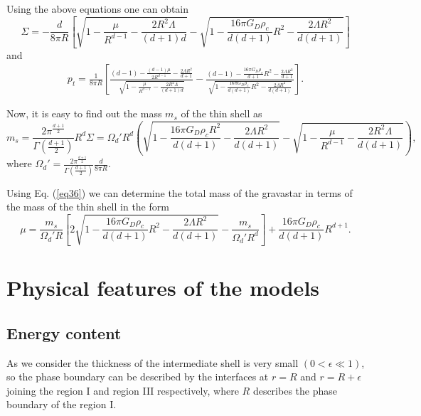 \documentclass[preprint,12pt]{elsarticle}
\begin{document}
Using the above equations one can obtain
\begin{equation}
\Sigma=-\frac{d}{8\pi R}\left[\sqrt{1 - \frac{\mu}{ R^{d-1}}-\frac{2R^2 \Lambda}{(d+1)d}}-
\sqrt{ 1-\frac{16\pi G_D\rho_c}{d(d+1)}R^2-\frac{2\Lambda R^2}{d(d+1)}}\right] \label{eq34}
\end{equation}
and
\begin{eqnarray}
p_t=\frac{1}{8\pi R}\left[\frac{(d-1)-\frac{(d-1)\mu}{2R^{d-1}}-\frac{2\Lambda R^2}{d+1}}{\sqrt{1 - \frac{\mu}{ R^{d-1}}-\frac{2R^2 \Lambda}{(d+1)d}}}-
\frac{(d-1)-\frac{16\pi G_D\rho_c}{d+1}R^2-\frac{2\Lambda R^2}{d+1}}{\sqrt{ 1-\frac{16\pi G_D\rho_c}{d(d+1)}R^2-\frac{2\Lambda R^2}{d(d+1)}}}\right]. \label{eq35}
\end{eqnarray}

Now, it is easy to find out the mass $m_s$  of the thin shell as
\begin{equation}
m_s=\frac{2\pi^{\frac{d+1}{2}}}{\Gamma(\frac{d+1}{2})}R^d \Sigma= \Omega_d' R^d \left(\sqrt{ 1-\frac{16\pi G_D\rho_c R^2}{d(d+1)}-\frac{2\Lambda R^2}{d(d+1)}}-\sqrt{1 - \frac{\mu}{ R^{d-1}}-\frac{2R^2 \Lambda}{d(d+1)}} \right), \label{eq36}
\end{equation}
where $\Omega_d'=\frac{2\pi^{\frac{d+1}{2}}}{\Gamma(\frac{d+1}{2})}\frac{d}{8\pi R}$.

Using Eq. (\ref{eq36}) we can determine the total mass of the gravastar in terms of the mass of the thin shell in the form
\begin{equation}
\mu=\frac{m_s }{\Omega_d' R}
\left[2\sqrt{ 1-\frac{16\pi G_D\rho_c}{d(d+1)}R^2-\frac{2\Lambda R^2}{d(d+1)}}-\frac{m_s}{\Omega_d' R^d}\right] + \frac{16 \pi G_D \rho_c }{d(d+1)}R^{d+1}. \label{eq37}
\end{equation}





\section{Physical features of the models}

\subsection{Energy content}
As we consider the thickness of the intermediate shell is very
small $(0 < \epsilon \ll 1)$, so the phase boundary can be described by
the interfaces at $r=R$ and $r=R+\epsilon$ joining the region I and
region III respectively, where $R$ describes the phase boundary of the region I.
\end{document}
